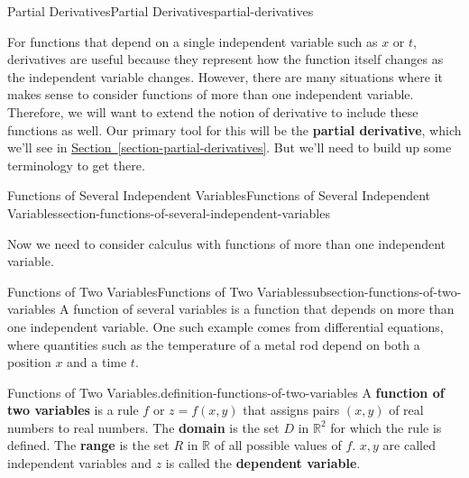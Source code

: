\documentclass[oneside,10pt,]{book}
\newcommand{\terminology}[1]{\textbf{#1}}
\numberwithin{equation}{section}
\newcommand{\RR}{\mathbb{R}}
\begin{document}
\begin{chapterptx}{Partial Derivatives}{}{Partial Derivatives}{}{}{partial-derivatives}
\begin{introduction}{}%
\hypertarget{p-1327}{}%
For functions that depend on a single independent variable such as \(x\) or \(t\), derivatives are useful because they represent how the function itself changes as the independent variable changes. However, there are many situations where it makes sense to consider functions of more than one independent variable. Therefore, we will want to extend the notion of derivative to include these functions as well. Our primary tool for this will be the \terminology{partial derivative}, which we'll see in \hyperref[section-partial-derivatives]{Section~\ref{section-partial-derivatives}}. But we'll need to build up some terminology to get there.%
\end{introduction}%
%
%
\typeout{************************************************}
\typeout{************************************************}
%
\begin{sectionptx}{Functions of Several Independent Variables}{}{Functions of Several Independent Variables}{}{}{section-functions-of-several-independent-variables}
\begin{introduction}{}%
\hypertarget{p-1328}{}%
Now we need to consider calculus with functions of more than one independent variable.%
\end{introduction}%
%
%
\typeout{************************************************}
\typeout{************************************************}
%
\begin{subsectionptx}{Functions of Two Variables}{}{Functions of Two Variables}{}{}{subsection-functions-of-two-variables}
\hypertarget{p-1329}{}%
A function of several variables is a function that depends on more than one independent variable. One such example comes from differential equations, where quantities such as the temperature of a metal rod depend on both a position \(x\) and a time \(t\).%
\begin{definition}{Functions of Two Variables.}{definition-functions-of-two-variables}%
\hypertarget{p-1330}{}%
A \terminology{function of two variables} is a rule \(f\) or \(z = f(x,y)\) that assigns pairs \((x,y)\) of real numbers to real numbers. The \terminology{domain} is the set \(D\) in \(\RR^{2}\) for which the rule is defined. The \terminology{range} is the set \(R\) in \(\RR\) of all possible values of \(f\). \(x,y\) are called independent variables and \(z\) is called the \terminology{dependent variable}.%

\end{definition}
\end{subsectionptx}
\end{sectionptx}
\end{chapterptx}
\end{document}
